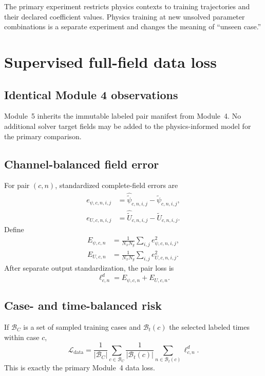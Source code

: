 \documentclass[11pt]{article}
\newcommand{\Ldata}{\mathcal{L}_{\mathrm{data}}}
\begin{document}
The primary experiment restricts physics contexts to training trajectories and their declared coefficient values. Physics training at new unsolved parameter combinations is a separate experiment and changes the meaning of ``unseen case.''

\section{Supervised full-field data loss}
\label{sec:data_loss}

\subsection{Identical Module 4 observations}
Module~5 inherits the immutable labeled pair manifest from Module~4. No additional solver target fields may be added to the physics-informed model for the primary comparison.

\subsection{Channel-balanced field error}
For pair $(c,n)$, standardized complete-field errors are
\begin{align}
e_{\psi,c,n,i,j}&=\widehat{\widetilde\psi}_{c,n,i,j}-\widetilde\psi_{c,n,i,j},\\
e_{U,c,n,i,j}&=\widehat{\widetilde U}_{c,n,i,j}-\widetilde U_{c,n,i,j}.
\end{align}
Define
\begin{align}
E_{\psi,c,n}&=\frac{1}{N_xN_y}\sum_{i,j}e_{\psi,c,n,i,j}^2,\\
E_{U,c,n}&=\frac{1}{N_xN_y}\sum_{i,j}e_{U,c,n,i,j}^2.
\end{align}
After separate output standardization, the pair loss is
\begin{equation}
\ell^d_{c,n}=E_{\psi,c,n}+E_{U,c,n}.
\end{equation}

\subsection{Case- and time-balanced risk}
If $\mathcal{B}_C$ is a set of sampled training cases and $\mathcal{B}_t(c)$ the selected labeled times within case $c$,
\begin{equation}
\boxed{
\Ldata=
\frac{1}{|\mathcal{B}_C|}
\sum_{c\in\mathcal{B}_C}
\frac{1}{|\mathcal{B}_t(c)|}
\sum_{n\in\mathcal{B}_t(c)}\ell^d_{c,n}.
}
\label{eq:data_loss}
\end{equation}
This is exactly the primary Module~4 data loss.
\end{document}
